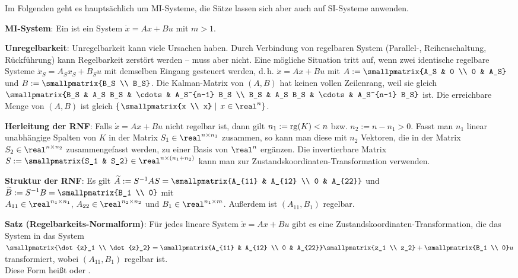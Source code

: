 Im Folgenden geht es hauptsächlich um MI-Systeme, die Sätze lassen sich aber auch auf SI-Systeme
anwenden.

\textbf{MI-System}:
Ein  ist ein System $\dot{x} = Ax + Bu$ mit $m > 1$.

\linie

\textbf{Unregelbarkeit}:
Unregelbarkeit kann viele Ursachen haben.
Durch Verbindung von regelbaren System (Parallel-, Reihenschaltung, Rückführung)
kann Regelbarkeit zerstört werden -- muss aber nicht.
Eine mögliche Situation tritt auf,
wenn zwei identische regelbare Systeme $\dot{x}_S = A_S x_S + B_S u$ mit demselben
Eingang gesteuert werden,
d.\,h. $\dot{x} = Ax + Bu$ mit $A := \smallpmatrix{A_S & 0 \\ 0 & A_S}$ und
$B := \smallpmatrix{B_S \\ B_S}$.
Die Kalman-Matrix von $(A, B)$ hat keinen vollen Zeilenrang, weil sie gleich
$\smallpmatrix{B_S & A_S B_S & \cdots & A_S^{n-1} B_S \\ B_S & A_S B_S & \cdots & A_S^{n-1} B_S}$
ist.
Die erreichbare Menge von $(A, B)$ ist gleich
$\left\{\left.\smallpmatrix{x \\ x} \;\right|\; x \in \real^n\right\}$.

\linie

\textbf{Herleitung der RNF}:
Falls $\dot{x} = Ax + Bu$ nicht regelbar ist, dann gilt $n_1 := \operatorname{rg}(K) < n$
bzw. $n_2 := n - n_1 > 0$.
Fasst man $n_1$ linear unabhängige Spalten von $K$ in der Matrix $S_1 \in \real^{n \times n_1}$
zusammen, so kann man diese mit $n_2$ Vektoren, die in der Matrix $S_2 \in \real^{n \times n_2}$
zusammengefasst werden, zu einer Basis von $\real^n$ ergänzen.
Die invertierbare Matrix $S := \smallpmatrix{S_1 & S_2} \in \real^{n \times (n_1 + n_2)}$
kann man zur Zustandskoordinaten-Transformation verwenden.

\textbf{Struktur der RNF}:
Es gilt $\widetilde{A} := S^{-1} AS = \smallpmatrix{A_{11} & A_{12} \\ 0 & A_{22}}$
und $\widetilde{B} := S^{-1} B = \smallpmatrix{B_1 \\ 0}$ mit\\
$A_{11} \in \real^{n_1 \times n_1}$, $A_{22} \in \real^{n_2 \times n_2}$ und
$B_1 \in \real^{n_1 \times m}$.
Außerdem ist $(A_{11}, B_1)$ regelbar.

\textbf{Satz (Regelbarkeits-Normalform)}:
Für jedes lineare System $\dot{x} = Ax + Bu$ gibt es eine Zustandskoordinaten-Transformation,
die das System in das System\\
$\smallpmatrix{\dot{z}_1 \\ \dot{z}_2} =
\smallpmatrix{A_{11} & A_{12} \\ 0 & A_{22}} \smallpmatrix{z_1 \\ z_2} +
\smallpmatrix{B_1 \\ 0} u$ transformiert,
wobei $(A_{11}, B_1)$ regelbar ist.\\
Diese Form heißt
 oder .

